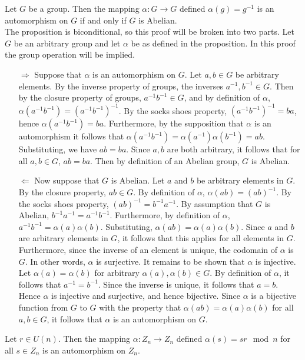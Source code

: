 \documentclass{article}
\begin{document}
 Let $G$ be a group. Then the mapping $\alpha:G\rightarrow G$ defined $\alpha(g) = g^{-1}$ is an automorphism on $G$ if and only if $G$ is Abelian.\\
 The proposition is biconditional, so this proof will be broken into two parts. Let $G$ be an arbitrary group and let $\alpha$ be as defined in the proposition. In this proof the group operation will be implied.
\begin{itemize}
    \item[$\Rightarrow$] Suppose that $\alpha$ is an automorphism on $G$. Let $a,b\in G$ be arbitrary elements. By the inverse property of groups, the inverses $a^{-1},b^{-1} \in G$. Then by the closure property of groups, $a^{-1}b^{-1}\in G$, and by definition of $\alpha$, $\alpha(a^{-1}b^{-1}) = (a^{-1}b^{-1})^{-1}$. By the socks shoes property, $(a^{-1}b^{-1})^{-1} = ba$, hence $\alpha(a^{-1}b^{-1}) = ba$. Furthermore, by the supposition that $\alpha$ is an automorphism it follows that $\alpha(a^{-1}b^{-1}) = \alpha(a^{-1})\alpha(b^{-1})= ab$. Substituting, we have $ab = ba$. Since $a,b$ are both arbitrary, it follows that for all $a,b\in G$, $ab = ba$. Then by definition of an Abelian group, $G$ is Abelian.
    \item[$\Leftarrow$] Now suppose that $G$ is Abelian. Let $a$ and $b$ be arbitrary elements in $G$. By the closure property, $ab\in G$. By definition of $\alpha$, $\alpha(ab) = (ab)^{-1}$. By the socks shoes property, $(ab)^{-1} = b^{-1}a^{-1}$. By assumption that $G$ is Abelian, $b^{-1}a^{-1} = a^{-1}b^{-1}$. Furthermore, by definition of $\alpha$, $a^{-1}b^{-1} = \alpha(a)\alpha(b)$. Substituting, $\alpha(ab) = \alpha(a)\alpha(b)$. Since $a$ and $b$ are arbitrary elements in $G$, it follows that this applies for all elements in $G$. Furthermore, since the inverse of an element is unique, the codomain of $\alpha$ is $G$. In other words, $\alpha$ is surjective. It remains to be shown that $\alpha$ is injective. Let $\alpha(a) = \alpha(b)$ for arbitrary $\alpha(a),\alpha(b)\in G$. By definition of $\alpha$, it follows that $a^{-1} = b^{-1}$. Since the inverse is unique, it follows that $a = b$. Hence $\alpha$ is injective and surjective, and hence bijective. Since $\alpha$ is a bijective function from $G$ to $G$ with the property that $\alpha(ab) = \alpha(a)\alpha(b)$ for all $a,b\in G$, it follows that $\alpha$ is an automorphism on $G$.
\end{itemize}

 Let $r\in U(n)$. Then the mapping $\alpha:Z_n\rightarrow Z_n$ defined $\alpha(s) = sr \mod n$ for all $s\in Z_n$ is an automorphism on $Z_n$.\\
\end{document}

